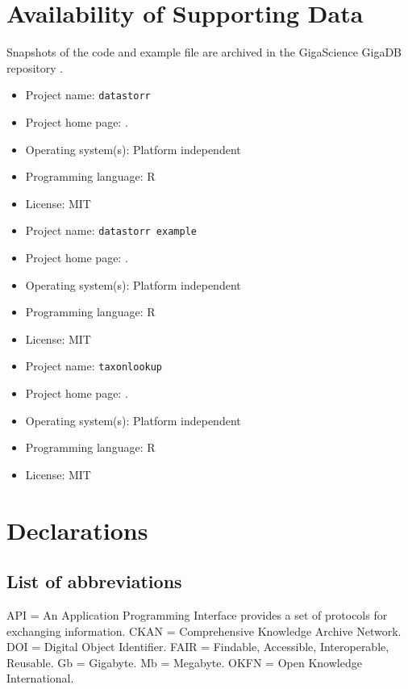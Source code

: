 \documentclass[a4paper,num-refs]{oup-contemporary}
\begin{document}
\section{Availability of Supporting Data}

Snapshots of the code and example file are archived in the GigaScience GigaDB repository \cite{Falster-2019}.

\begin{itemize}
\item Project name:  \texttt{datastorr} 
\item Project home page: .
\item Operating system(s): Platform independent
\item Programming language: R
\item License: MIT
\end{itemize}

\begin{itemize}
\item Project name:  \texttt{datastorr example} 
\item Project home page: .
\item Operating system(s): Platform independent
\item Programming language: R
\item License: MIT
\end{itemize}

\begin{itemize}
\item Project name:  \texttt{taxonlookup} 
\item Project home page: .
\item Operating system(s): Platform independent
\item Programming language: R
\item License: MIT
\end{itemize}

\section{Declarations}

\subsection{List of abbreviations}
API = An Application Programming Interface provides a set of protocols for exchanging information. 
CKAN = Comprehensive Knowledge Archive Network.
DOI = Digital Object Identifier.
FAIR =  Findable, Accessible, Interoperable, Reusable.
Gb =  Gigabyte.
Mb =  Megabyte.
OKFN = Open Knowledge International.
\end{document}
